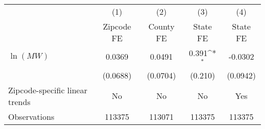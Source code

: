 {
\def\sym#1{\ifmmode^{#1}\else\(^{#1}\)\fi}
\begin{tabular}{l*{4}{c}}
\hline\hline
          &\multicolumn{1}{c}{(1)}&\multicolumn{1}{c}{(2)}&\multicolumn{1}{c}{(3)}&\multicolumn{1}{c}{(4)}\\
          &\multicolumn{1}{c}{Zipcode FE}&\multicolumn{1}{c}{County FE}&\multicolumn{1}{c}{State FE}&\multicolumn{1}{c}{State FE}\\
\hline
$\ln(MW)$ &   0.0369         &   0.0491         &    0.391\sym{*}  &  -0.0302         \\
          & (0.0688)         & (0.0704)         &  (0.210)         & (0.0942)         \\
\hline
Zipcode-specific linear trends&       No         &       No         &       No         &      Yes         \\
Observations&   113375         &   113071         &   113375         &   113375         \\
\hline\hline
\end{tabular}
}
